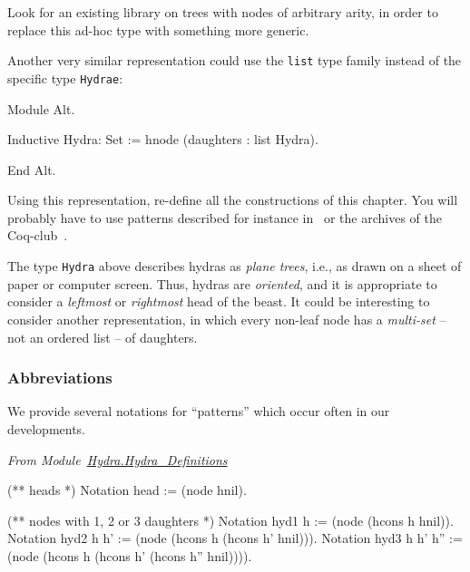 \documentclass[a4paper]{book}
\begin{document}

\begin{todo}
Look for an existing library on trees with nodes of arbitrary arity, in order to replace  this ad-hoc type with something more generic.
\end{todo}



\begin{project}[**]

 Another very similar representation could use the \texttt{list} type family instead of the specific 
type \texttt{Hydrae}:


\begin{Coqalt}
Module Alt.

Inductive Hydra: Set :=
  hnode (daughters : list Hydra).

End Alt.
\end{Coqalt}

Using this representation, re-define all the constructions of this chapter.
You will probably have to use patterns described for instance in~\cite{BC04} or the archives of the Coq-club~\cite{Coq}.

  
\end{project}



\begin{project}
The type \texttt{Hydra} above describes hydras as \emph{plane trees}, i.e., as drawn on a sheet of paper or computer screen. Thus, hydras are \emph{oriented},
and it is appropriate to consider a \emph{leftmost} or \emph{rightmost} head of
the beast. It could be interesting to consider another representation, in which
every non-leaf node has a \emph{multi-set} -- not an ordered list -- of daughters.
\end{project}

\subsubsection{Abbreviations}

We provide several notations for ``patterns'' which occur often in our developments. 

\emph{From Module~\href{../src/html/hydras.Hydra.Hydra_Definitions.html\#head}{Hydra.Hydra\_Definitions}}

\begin{Coqsrc}
(** heads *)
Notation head := (node hnil).
 
(** nodes  with 1, 2 or 3 daughters *)
Notation hyd1 h := (node (hcons h hnil)).
Notation hyd2 h h' := (node (hcons h (hcons h' hnil))).
Notation hyd3 h h' h'' := 
                   (node (hcons h (hcons h' (hcons h'' hnil)))).
\end{Coqsrc}
\end{document}
